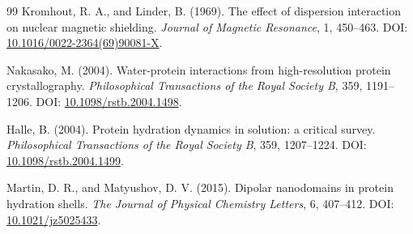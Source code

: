 \documentclass[11pt]{article}
\begin{document}
\begin{thebibliography}{99}
Kromhout, R. A., and Linder, B. (1969).
The effect of dispersion interaction on nuclear magnetic shielding.
\emph{Journal of Magnetic Resonance}, 1, 450--463.
DOI: \href{https://doi.org/10.1016/0022-2364(69)90081-X}{10.1016/0022-2364(69)90081-X}.

Nakasako, M. (2004).
Water-protein interactions from high-resolution protein crystallography.
\emph{Philosophical Transactions of the Royal Society B}, 359, 1191--1206.
DOI: \href{https://doi.org/10.1098/rstb.2004.1498}{10.1098/rstb.2004.1498}.

Halle, B. (2004).
Protein hydration dynamics in solution: a critical survey.
\emph{Philosophical Transactions of the Royal Society B}, 359, 1207--1224.
DOI: \href{https://doi.org/10.1098/rstb.2004.1499}{10.1098/rstb.2004.1499}.

Martin, D. R., and Matyushov, D. V. (2015).
Dipolar nanodomains in protein hydration shells.
\emph{The Journal of Physical Chemistry Letters}, 6, 407--412.
DOI: \href{https://doi.org/10.1021/jz5025433}{10.1021/jz5025433}.

\end{thebibliography}
\end{document}
